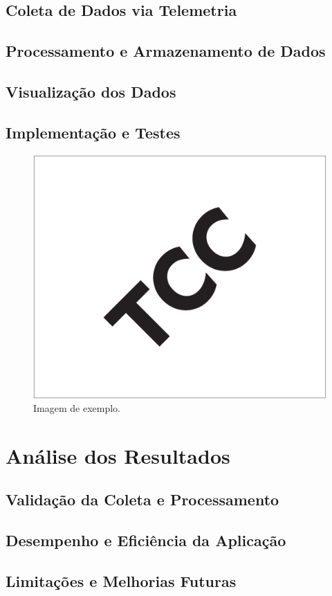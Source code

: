 \documentclass[12pt, %
openright, 
oneside, %
a4paper,    %
brazil]{facom-ufu-abntex2}
\begin{document}
\section{Coleta de Dados via Telemetria}
\section{Processamento e Armazenamento de Dados}
\section{Visualização dos Dados}
\section{Implementação e Testes}


\begin{figure}[!ht]
    \centering
	\includegraphics[width=0.55\linewidth]{imagemExemplo.pdf}
	\caption[Isso é o que aparece no sumário]{Imagem de exemplo.}
	\label{fig:graficosVariandoTamanhoRede}
\end{figure}


\chapter{Análise dos Resultados}
\section{Validação da Coleta e Processamento}
\section{Desempenho e Eficiência da Aplicação}
\section{Limitações e Melhorias Futuras}
\end{document}

